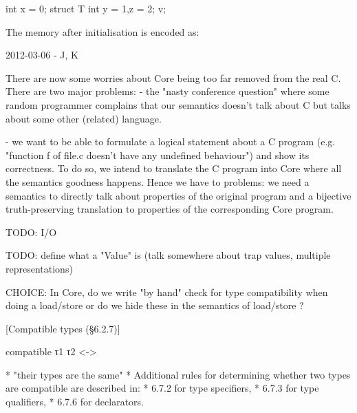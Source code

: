 \documentclass[12pt, a4paper]{article}
\begin{document}
    int x = 0;
    struct T {
      int y = 1,z = 2;
    } v;
  
  The memory after initialisation is encoded as:
  



2012-03-06 - J, K

There are now some worries about Core being too far removed from the real C.
There are two major problems:
  - the "nasty conference question" where some random programmer complains that
    our semantics doesn't talk about C but talks about some other (related)
    language.

  - we want to be able to formulate a logical statement about a C program (e.g.
    "function f of file.c doesn't have any undefined behaviour") and show its
    correctness. To do so, we intend to translate the C program into Core where
    all the semantics goodness happens. Hence we have to problems: we need a
    semantics to directly talk about properties of the original program and a
    bijective truth-preserving translation to properties of the corresponding
    Core program.





TODO: I/O

TODO: define what a "Value" is (talk somewhere about trap values, multiple representations)



CHOICE:
  In Core, do we write "by hand" check for type compatibility when doing a load/store or
  do we hide these in the semantics of load/store ?






















[Compatible types (§6.2.7)]
  
  compatible τ1 τ2 <->
    
    * "their types are the same"
    * Additional rules for determining whether two types are compatible are described in:
        * 6.7.2 for type specifiers,
        * 6.7.3 for type qualifiers,
        * 6.7.6 for declarators.
\end{document}
